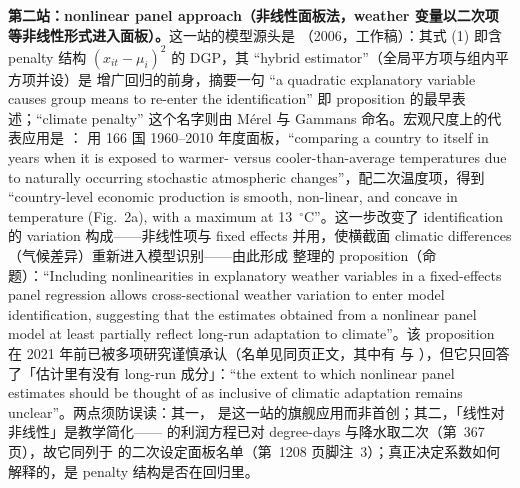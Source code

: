 \textbf{第二站：nonlinear panel approach（非线性面板法，weather 变量以二次项等非线性形式进入面板）。}这一站的模型源头是 \citet{mcintosh2006identifying}（2006，工作稿）：其式 (1) 即含 penalty 结构 $(x_{it}-\mu_i)^2$ 的 DGP，其 ``hybrid estimator''（全局平方项与组内平方项并设）是  增广回归的前身，摘要一句 ``a quadratic explanatory variable causes group means to re-enter the identification''\citep[摘要页；式 (1) 在第~4 页，hybrid estimator 在第~5--6 页]{mcintosh2006identifying} 即 proposition 的最早表述；``climate penalty'' 这个名字则由 Mérel 与 Gammans 命名\citep[第~1213 页]{merel2021climate}。宏观尺度上的代表应用是 ：\citet{burke2015global} 用 166 国 1960--2010 年度面板，``comparing a country to itself in years when it is exposed to warmer- versus cooler-than-average temperatures due to naturally occurring stochastic atmospheric changes''\citep[第~236 页]{burke2015global}，配二次温度项，得到 ``country-level economic production is smooth, non-linear, and concave in temperature (Fig.~2a), with a maximum at 13~$^\circ$C''\citep[第~236 页]{burke2015global}。这一步改变了 identification 的 variation 构成——非线性项与 fixed effects 并用，使横截面 climatic differences（气候差异）重新进入模型识别——由此形成 \citet{merel2021climate} 整理的 proposition（命题）：``Including nonlinearities in explanatory weather variables in a fixed-effects panel regression allows cross-sectional weather variation to enter model identification, suggesting that the estimates obtained from a nonlinear panel model at least partially reflect long-run adaptation to climate''\citep[第~1208 页]{merel2021climate}。该 proposition 在 2021 年前已被多项研究谨慎承认（名单见同页正文，其中有 \citealp{mcintosh2006identifying} 与 \citealp{burke2015global}），但它只回答了「估计里有没有 long-run 成分」：``the extent to which nonlinear panel estimates should be thought of as inclusive of climatic adaptation remains unclear''\citep[第~1208 页]{merel2021climate}。两点须防误读：其一，\citet{burke2015global} 是这一站的旗舰应用而非首创；其二，「线性对非线性」是教学简化——\citet{deschenes2007economic} 的利润方程已对 degree-days 与降水取二次（第~367 页），故它同列于 \citet{merel2021climate} 的二次设定面板名单（第~1208 页脚注~3）；真正决定系数如何解释的，是 penalty 结构是否在回归里。

